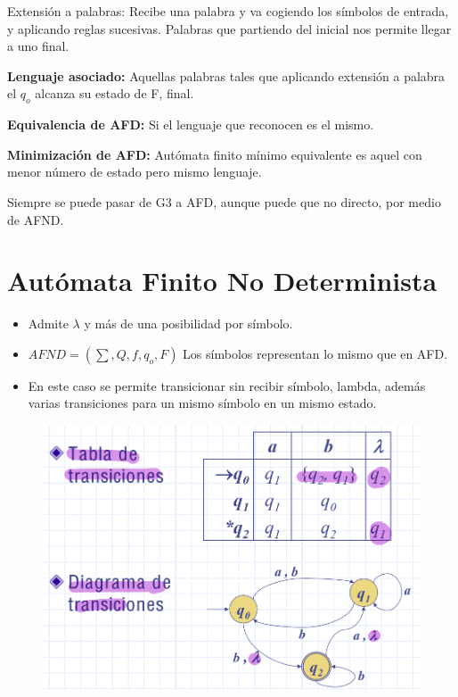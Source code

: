 \documentclass[12pt]{report} %
\begin{document}
Extensión a palabras: Recibe una palabra y va cogiendo los símbolos de
entrada, y aplicando reglas sucesivas. Palabras que partiendo del
inicial nos permite llegar a uno final.

\textbf{Lenguaje asociado:} Aquellas palabras tales que aplicando
extensión a palabra el \(q_o\) alcanza su estado de F, final.

\textbf{Equivalencia de AFD:} Si el lenguaje que reconocen es el mismo.

\textbf{Minimización de AFD:} Autómata finito mínimo equivalente es
aquel con menor número de estado pero mismo lenguaje.

Siempre se puede pasar de G3 a AFD, aunque puede que no directo, por
medio de AFND.


\section{Autómata Finito No Determinista}

\begin{itemize}
\item
  Admite \(\lambda\) y más de una posibilidad por símbolo.
\item
  \(AFND=( \sum, Q, f, q_o, F)\) Los símbolos representan lo mismo que
  en AFD.
\item
  En este caso se permite transicionar sin recibir símbolo, lambda,
  además varias transiciones para un mismo símbolo en un mismo estado.
\end{itemize}

\begin{figure}[H]
	{\includegraphics[scale=.4]{Untitled 4.png}}
\end{figure}
\end{document}
